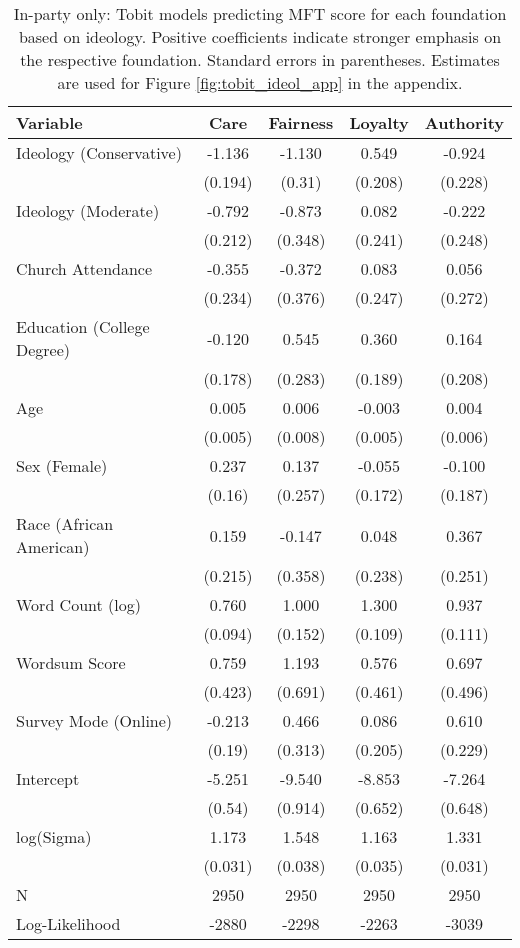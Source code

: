 \begin{table}[ht]
\centering
\caption[In-party only: Tobit models predicting MFT score for each foundation based 
           on ideology]{In-party only: Tobit models predicting MFT score for each foundation based 
           on ideology. Positive coefficients indicate stronger emphasis on the respective 
           foundation. Standard errors in parentheses. Estimates are used for 
           Figure \ref{fig:tobit_ideol_app} in the appendix.} 
\label{tab:tobit_in}
\begingroup\footnotesize
\begin{tabular}{lcccc}
  \hline
Variable & Care & Fairness & Loyalty & Authority \\ 
  \hline
Ideology (Conservative) & -1.136 & -1.130 &  0.549 & -0.924 \\ 
   & (0.194) & (0.31) & (0.208) & (0.228) \\ 
  Ideology (Moderate) & -0.792 & -0.873 &  0.082 & -0.222 \\ 
   & (0.212) & (0.348) & (0.241) & (0.248) \\ 
  Church Attendance & -0.355 & -0.372 &  0.083 &  0.056 \\ 
   & (0.234) & (0.376) & (0.247) & (0.272) \\ 
  Education (College Degree) & -0.120 &  0.545 &  0.360 &  0.164 \\ 
   & (0.178) & (0.283) & (0.189) & (0.208) \\ 
  Age &  0.005 &  0.006 & -0.003 &  0.004 \\ 
   & (0.005) & (0.008) & (0.005) & (0.006) \\ 
  Sex (Female) &  0.237 &  0.137 & -0.055 & -0.100 \\ 
   & (0.16) & (0.257) & (0.172) & (0.187) \\ 
  Race (African American) &  0.159 & -0.147 &  0.048 &  0.367 \\ 
   & (0.215) & (0.358) & (0.238) & (0.251) \\ 
  Word Count (log) &  0.760 &  1.000 &  1.300 &  0.937 \\ 
   & (0.094) & (0.152) & (0.109) & (0.111) \\ 
  Wordsum Score &  0.759 &  1.193 &  0.576 &  0.697 \\ 
   & (0.423) & (0.691) & (0.461) & (0.496) \\ 
  Survey Mode (Online) & -0.213 &  0.466 &  0.086 &  0.610 \\ 
   & (0.19) & (0.313) & (0.205) & (0.229) \\ 
  Intercept & -5.251 & -9.540 & -8.853 & -7.264 \\ 
   & (0.54) & (0.914) & (0.652) & (0.648) \\ 
  log(Sigma) &  1.173 &  1.548 &  1.163 &  1.331 \\ 
   & (0.031) & (0.038) & (0.035) & (0.031) \\ 
   \hline
N & 2950 & 2950 & 2950 & 2950 \\ 
  Log-Likelihood & -2880 & -2298 & -2263 & -3039 \\ 
   \hline
\end{tabular}
\endgroup
\end{table}
